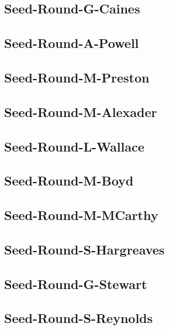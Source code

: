 \documentclass[letterpaper,10pt,english]{sphinxmanual}
\begin{document}
\subsection{Seed-Round-G-Caines}
\label{\detokenize{statements:seed-round-g-caines}}

\subsection{Seed-Round-A-Powell}
\label{\detokenize{statements:seed-round-a-powell}}

\subsection{Seed-Round-M-Preston}
\label{\detokenize{statements:seed-round-m-preston}}

\subsection{Seed-Round-M-Alexader}
\label{\detokenize{statements:seed-round-m-alexader}}

\subsection{Seed-Round-L-Wallace}
\label{\detokenize{statements:seed-round-l-wallace}}

\subsection{Seed-Round-M-Boyd}
\label{\detokenize{statements:seed-round-m-boyd}}

\subsection{Seed-Round-M-MCarthy}
\label{\detokenize{statements:seed-round-m-mcarthy}}

\subsection{Seed-Round-S-Hargreaves}
\label{\detokenize{statements:seed-round-s-hargreaves}}

\subsection{Seed-Round-G-Stewart}
\label{\detokenize{statements:seed-round-g-stewart}}

\subsection{Seed-Round-S-Reynolds}
\label{\detokenize{statements:seed-round-s-reynolds}}
\end{document}
